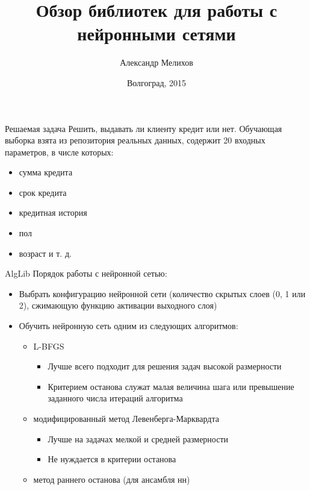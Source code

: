 \documentclass{beamer}
\begin{document}
\title{Обзор библиотек для работы с нейронными сетями}
\author{Александр Мелихов}
\date{Волгоград, 2015}

\frame{\titlepage}

\begin{frame}{Решаемая задача}
    Решить, выдавать ли клиенту кредит или нет. Обучающая выборка взята из
    репозитория реальных данных, содержит 20 входных параметров, в числе которых:
    \begin{itemize}
        \item сумма кредита
        \item срок кредита
        \item кредитная история
        \item пол
        \item возраст и т. д.
    \end{itemize}
\end{frame}

\begin{frame}{AlgLib}
    Порядок работы с нейронной сетью:
    \begin{itemize}
        \item Выбрать конфигурацию нейронной сети (количество скрытых слоев (0,
            1 или 2), сжимающую функцию активации выходного слоя)
        \item Обучить нейронную сеть одним из следующих алгоритмов:
            \begin{itemize}
                \item L-BFGS
                    \begin{itemize}
                        \item Лучше всего подходит для решения задач высокой
                            размерности
                        \item Критерием останова служат малая величина шага или
                            превышение заданного числа итераций алгоритма
                    \end{itemize}
                \item модифицированный метод Левенберга-Марквардта
                    \begin{itemize}
                        \item Лучше на задачах мелкой и средней размерности
                        \item Не нуждается в критерии останова
                    \end{itemize}
                \item метод раннего останова (для ансамбля нн)
            \end{itemize}
    \end{itemize}
\end{frame}
\end{document}
